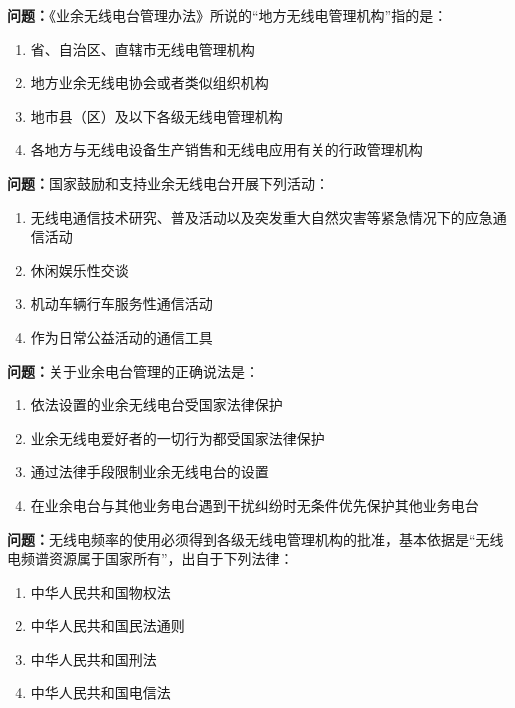\bigskip


\noindent\textbf{问题：}《业余无线电台管理办法》所说的“地方无线电管理机构”指的是：
\begin{enumerate}[label=\Alph*), leftmargin=3em]
\item 省、自治区、直辖市无线电管理机构
\item 地方业余无线电协会或者类似组织机构
\item 地市县（区）及以下各级无线电管理机构
\item 各地方与无线电设备生产销售和无线电应用有关的行政管理机构
\end{enumerate}

\bigskip


\noindent\textbf{问题：}国家鼓励和支持业余无线电台开展下列活动：
\begin{enumerate}[label=\Alph*), leftmargin=3em]
\item 无线电通信技术研究、普及活动以及突发重大自然灾害等紧急情况下的应急通信活动
\item 休闲娱乐性交谈
\item 机动车辆行车服务性通信活动
\item 作为日常公益活动的通信工具
\end{enumerate}

\bigskip


\noindent\textbf{问题：}关于业余电台管理的正确说法是：
\begin{enumerate}[label=\Alph*), leftmargin=3em]
\item 依法设置的业余无线电台受国家法律保护
\item 业余无线电爱好者的一切行为都受国家法律保护
\item 通过法律手段限制业余无线电台的设置
\item 在业余电台与其他业务电台遇到干扰纠纷时无条件优先保护其他业务电台
\end{enumerate}

\bigskip


\noindent\textbf{问题：}无线电频率的使用必须得到各级无线电管理机构的批准，基本依据是“无线电频谱资源属于国家所有”，出自于下列法律：
\begin{enumerate}[label=\Alph*), leftmargin=3em]
\item 中华人民共和国物权法
\item 中华人民共和国民法通则
\item 中华人民共和国刑法
\item 中华人民共和国电信法
\end{enumerate}

\bigskip


